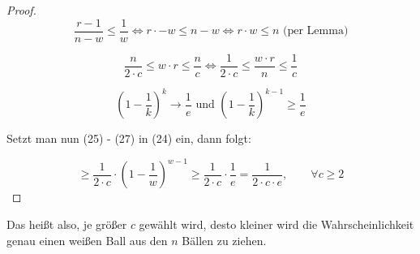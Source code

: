 \documentclass{article}
\begin{document}
\begin{proof}
  \begin{equation}
    \frac{r - 1}{n - w} \leq \frac{1}{w}
      \Longleftrightarrow r \cdot  - w \leq n - w
      \Longleftrightarrow r \cdot w \leq n \text{ (per Lemma)}
  \end{equation}

  \begin{equation}
    \frac{n}{2 \cdot c} \leq w \cdot r \leq \frac{n}{c}
      \Longleftrightarrow \frac{1}{2 \cdot c} \leq \frac{w \cdot r}{n} \leq \frac{1}{c}
  \end{equation}

  \begin{equation}
    \left( 1 - \frac{1}{k} \right)^k \rightarrow \frac{1}{e} \text{ und }
    \left( 1 - \frac{1}{k} \right)^{k - 1} \geq \frac{1}{e}
  \end{equation}

  \bigskip
  \noindent
  Setzt man nun (25) - (27) in (24) ein, dann folgt:

  \begin{equation}
    \geq \frac{1}{2 \cdot c} \cdot \left( 1 - \frac{1}{w} \right)^{w - 1}
    \geq \frac{1}{2 \cdot c} \cdot \frac{1}{e} = \frac{1}{2 \cdot c \cdot e},
    \qquad \forall c \geq 2
  \end{equation}
\end{proof}

\noindent
Das hei{\ss}t also, je gr{\"o}{\ss}er $c$ gew{\"a}hlt wird, desto kleiner wird die
Wahrscheinlichkeit genau einen wei{\ss}en Ball aus den $n$ B{\"a}llen zu ziehen.
\end{document}
